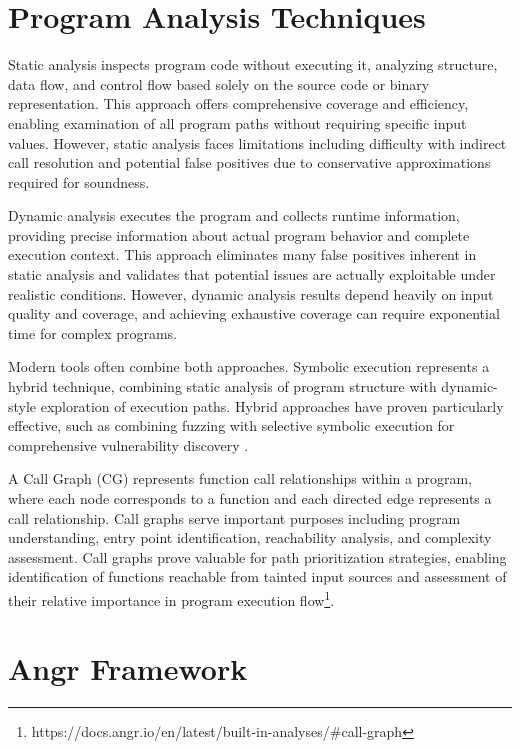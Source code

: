 \section{Program Analysis Techniques}

Static analysis inspects program code without executing it, analyzing structure, data flow, and control flow based solely on the source code or binary representation. This approach offers comprehensive coverage and efficiency, enabling examination of all program paths without requiring specific input values. However, static analysis faces limitations including difficulty with indirect call resolution and potential false positives due to conservative approximations required for soundness.

Dynamic analysis executes the program and collects runtime information, providing precise information about actual program behavior and complete execution context. This approach eliminates many false positives inherent in static analysis and validates that potential issues are actually exploitable under realistic conditions. However, dynamic analysis results depend heavily on input quality and coverage, and achieving exhaustive coverage can require exponential time for complex programs.

Modern tools often combine both approaches. Symbolic execution represents a hybrid technique, combining static analysis of program structure with dynamic-style exploration of execution paths. Hybrid approaches have proven particularly effective, such as combining fuzzing with selective symbolic execution for comprehensive vulnerability discovery \cite{stephens_driller_2016}.

A Call Graph (CG) represents function call relationships within a program, where each node corresponds to a function and each directed edge represents a call relationship. Call graphs serve important purposes including program understanding, entry point identification, reachability analysis, and complexity assessment. Call graphs prove valuable for path prioritization strategies, enabling identification of functions reachable from tainted input sources and assessment of their relative importance in program execution flow\footnote{https://docs.angr.io/en/latest/built-in-analyses/\#call-graph}.

\section{Angr Framework}

